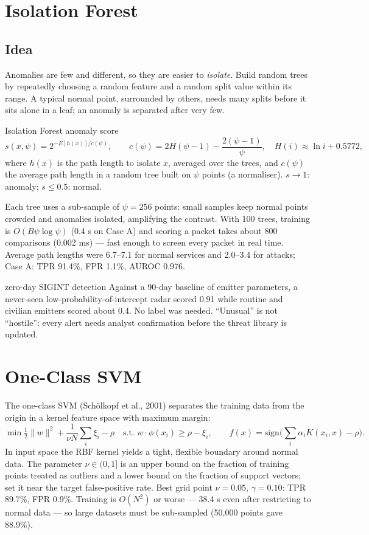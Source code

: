 \documentclass[11pt]{article}
\begin{document}
\section{Isolation Forest}
\subsection{Idea}
Anomalies are few and different, so they are easier to \emph{isolate}. Build random trees by repeatedly choosing a random feature and a random split value within its range. A typical normal point, surrounded by others, needs many splits before it sits alone in a leaf; an anomaly is separated after very few.
\begin{definition}{Isolation Forest anomaly score}
\[s(x,\psi)=2^{-E[h(x)]/c(\psi)},\qquad c(\psi)=2H(\psi-1)-\frac{2(\psi-1)}{\psi},\quad H(i)\approx\ln i+0.5772,\]
where $h(x)$ is the path length to isolate $x$, averaged over the trees, and $c(\psi)$ the average path length in a random tree built on $\psi$ points (a normaliser). $s\to1$: anomaly; $s\le0.5$: normal.
\end{definition}
Each tree uses a sub-sample of $\psi=256$ points: small samples keep normal points crowded and anomalies isolated, amplifying the contrast. With 100 trees, training is $O(B\psi\log\psi)$ (0.4 s on Case A) and scoring a packet takes about 800 comparisons (0.002 ms) --- fast enough to screen every packet in real time. Average path lengths were 6.7--7.1 for normal services and 2.0--3.4 for attacks; Case A: TPR 91.4\%, FPR 1.1\%, AUROC 0.976.

\begin{defence}{zero-day SIGINT detection}
Against a 90-day baseline of emitter parameters, a never-seen low-probability-of-intercept radar scored 0.91 while routine and civilian emitters scored about 0.4. No label was needed. ``Unusual'' is not ``hostile'': every alert needs analyst confirmation before the threat library is updated.
\end{defence}

\section{One-Class SVM}
The one-class SVM (Schölkopf et al., 2001) separates the training data from the origin in a kernel feature space with maximum margin:
\[\min\tfrac12\|w\|^2+\frac{1}{\nu N}\sum_i\xi_i-\rho\quad\text{s.t. }w\cdot\phi(x_i)\ge\rho-\xi_i,\qquad f(x)=\text{sign}\Big(\sum_i\alpha_iK(x_i,x)-\rho\Big).\]
In input space the RBF kernel yields a tight, flexible boundary around normal data. The parameter $\nu\in(0,1]$ is an upper bound on the fraction of training points treated as outliers and a lower bound on the fraction of support vectors; set it near the target false-positive rate. Best grid point $\nu=0.05$, $\gamma=0.10$: TPR 89.7\%, FPR 0.9\%. Training is $O(N^2)$ or worse --- 38.4 s even after restricting to normal data --- so large datasets must be sub-sampled (50,000 points gave 88.9\%).
\end{document}
